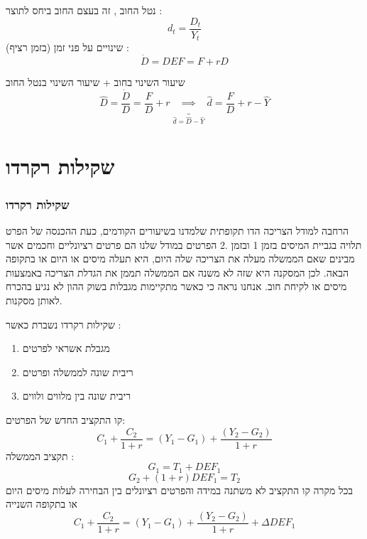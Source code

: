 \documentclass[usenames,dvipsnames]{beamer}
\begin{document}
\begin{RTL}
\begin{frame}[allowframebreaks]
    נטל החוב , זה בעצם החוב ביחס לתוצר :
    \[d_t = \frac{D_t}{Y_t}\]
    שינויים על פני זמן (בזמן רציף) : 
    \[\dot D = DEF  = F + rD\]
    \begin{block}{שיעור השינוי בחוב + שיעור השינוי בנטל החוב }
    \[\hat D = \frac{\dot D }{D } = \frac{F}{D} + r  \underbrace{\implies}_{\hat d = \hat D - \hat Y} \hat d  = \frac{F}{D} + r - \hat Y\]
        
    \end{block}
\end{frame}
\section{שקילות רקרדו}
\begin{frame}[allowframebreaks]
    \frametitle{שקילות רקרדו}
    הרחבה למודל הצריכה הדו תקופתית שלמדנו בשיעורים הקודמים, כעת ההכנסה של הפרט תלויה
בגביית המיסים בזמן 1 ובזמן .2 הפרטים במודל שלנו הם פרטים רציונליים וחכמים אשר מבינים
שאם הממשלה מעלה את הצריכה שלה היום, היא תעלה מיסים או היום או בתקופה הבאה. לכן
המסקנה היא שזה לא משנה אם הממשלה תממן את הגדלת הצריכה באמצעות מיסים או לקיחת
חוב. אנחנו נראה כי כאשר מתקיימות מגבלות בשוק ההון לא נגיע בהכרח לאותן מסקנות.
    
\framebreak
\begin{alertblock}{שקילות רקרדו נשברת כאשר : }
    
\begin{enumerate}
    \item מגבלת אשראי לפרטים
    \item ריבית שונה לממשלה ופרטים
    \item ריבית שונה בין מלווים ולווים
\end{enumerate}
\end{alertblock}

\framebreak
קו התקציב החדש של הפרטים:
\[C_1 + \frac{C_2}{1+r} = (Y_1 - G_1) +\frac{(Y_2 - G_2)}{1+r} \]
תקציב הממשלה :
\[G_1 = T_1 + DEF_1\]
\[G_2  +(1+r)DEF_1 = T_2\]
בכל מקרה קו התקציב לא משתנה במידה והפרטים רציונלים בין הבחירה לעלות מיסים היום או בתקופה השנייה
\[C_1 + \frac{C_2}{1+r} = (Y_1 - G_1) +\frac{(Y_2 - G_2)}{1+r} + \Delta DEF_1 \]
\end{frame}
\end{RTL}
\end{document}
